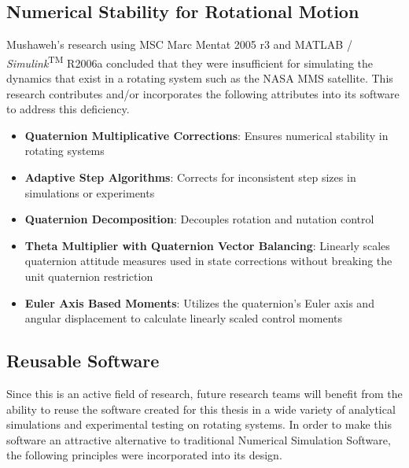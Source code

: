 \subsection{Numerical Stability for Rotational Motion}
\label{subsec:NumericalStabilityforRotationalMotion}

Mushaweh's research using MSC Marc Mentat 2005 r3 and MATLAB / \textit{Simulink}\textsuperscript{TM} R2006a concluded that they were insufficient for simulating the dynamics that exist in a rotating system such as the NASA MMS satellite.  This research contributes and/or incorporates the following attributes into its software to address this deficiency.

\begin{itemize}
  \item \textbf{Quaternion Multiplicative Corrections}: Ensures numerical stability in rotating systems
  \item \textbf{Adaptive Step Algorithms}: Corrects for inconsistent step sizes in simulations or experiments
  \item \textbf{Quaternion Decomposition}: Decouples rotation and nutation control
  \item \textbf{Theta Multiplier with Quaternion Vector Balancing}: Linearly scales quaternion attitude measures used in state corrections without breaking the unit quaternion restriction
  \item \textbf{Euler Axis Based Moments}: Utilizes the quaternion's Euler axis and angular displacement to calculate linearly scaled control moments
\end{itemize}

\subsection{Reusable Software}
\label{subsec:ReusableSoftware}

Since this is an active field of research, future research teams will benefit from the ability to reuse the software created for this thesis in a wide variety of analytical simulations and experimental testing on rotating systems.  In order to make this software an attractive alternative to traditional Numerical Simulation Software, the following principles were incorporated into its design.

